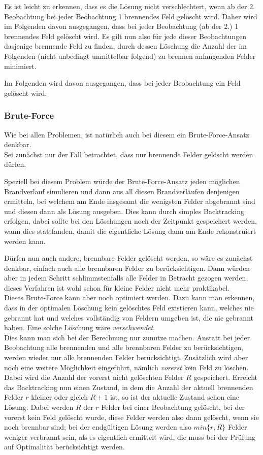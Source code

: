 Es ist leicht zu erkennen, dass es die Lösung nicht verschlechtert, wenn ab der 2. Beobachtung bei jeder Beobachtung 1 brennendes Feld gelöscht wird. Daher wird im Folgenden davon ausgegangen, dass bei jeder Beobachtung (ab der 2.) 1 brennendes Feld gelöscht wird. Es gilt nun also für jede dieser Beobachtungen dasjenige brennende Feld zu finden, durch dessen Löschung die Anzahl der im Folgenden (nicht unbedingt unmittelbar folgend) zu brennen anfangenden Felder minimiert.

Im Folgenden wird davon ausgegangen, dass bei jeder Beobachtung ein Feld gelöscht wird.

\subsubsection*{Brute-Force}

Wie bei allen Problemen, ist natürlich auch bei diesem ein Brute-Force-Ansatz denkbar.\\
Sei zunächst nur der Fall betrachtet, dass nur brennende Felder gelöscht werden dürfen. 

Speziell bei diesem Problem würde der Brute-Force-Ansatz jeden möglichen Brandverlauf simulieren und dann aus all diesen Brandverläufen denjenigen ermitteln, bei welchem am Ende insgesamt die wenigsten Felder abgebrannt sind und diesen dann als Lösung ausgeben. Dies kann durch simples Backtracking erfolgen, dabei sollte bei den Löschungen noch der Zeitpunkt gespeichert werden, wann dies stattfanden, damit die eigentliche Lösung dann am Ende rekonstruiert werden kann.

Dürfen nun auch andere, brennbare Felder gelöscht werden, so wäre es zunächst denkbar, einfach auch alle brennbaren Felder zu berücksichtigen. Dann würden aber in jedem Schritt schlimmstenfalls alle Felder in Betracht gezogen werden, dieses Verfahren ist wohl schon für kleine Felder nicht mehr praktikabel. \\
Dieses Brute-Force kann aber noch optimiert werden. Dazu kann man erkennen, dass in der optimalen Löschung kein gelöschtes Feld existieren kann, welches nie gebrannt hat und welches vollständig von Feldern umgeben ist, die nie gebrannt haben. Eine solche Löschung wäre \emph{verschwendet}.\\
Dies kann man sich bei der Berechnung nur zunutze machen. Anstatt bei jeder Beobachtung alle brennenden und alle brennbaren Felder zu berücksichtigen, werden wieder nur alle brennenden Felder berücksichtigt. Zusätzlich wird aber noch eine weitere Möglichkeit eingeführt, nämlich \emph{vorerst} kein Feld zu löschen. Dabei wird die Anzahl der vorerst nicht gelöschten Felder $R$ gespeichert. Erreicht das Backtracking nun einen Zustand, in dem die Anzahl der aktuell brennenden Felder $r$ kleiner oder gleich $R + 1$ ist, so ist der aktuelle Zustand schon eine Lösung. Dabei werden $R$ der $r$ Felder bei einer Beobachtung gelöscht, bei der vorerst kein Feld gelöscht wurde, diese Felder werden also dann gelöscht, wenn sie noch brennbar sind; bei der endgültigen Lösung werden also $min\{r,R\}$ Felder weniger verbrannt sein, als es eigentlich ermittelt wird, die muss bei der Prüfung auf Optimalität berücksichtigt werden.
